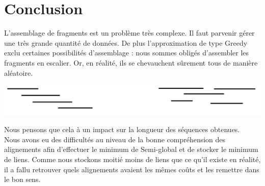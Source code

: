 \documentclass{article}
\begin{document}
\newpage
\section{Conclusion}
L'assemblage de fragments est un problème très complexe. Il faut parvenir gérer une très grande quantité de données. De plus l'approximation de type Greedy exclu certaines possibilités d'assemblage : nous sommes obligés d'assembler les fragments en escalier. Or, en réalité, ils se chevauchent sûrement tous de manière aléatoire.  \\
\begin{center}
\includegraphics[scale=0.5]{alignement1.png}
\end{center}

Nous pensons que cela à un impact sur la longueur des séquences obtenues. \\

Nous avons eu des difficultés au niveau de la bonne compréhension des alignements afin d'effectuer le minimum de Semi-global et de stocker le minimum de liens. Comme nous stockons moitié moins de liens que ce qu'il existe en réalité, il a fallu retrouver quels alignements avaient les mêmes coûts et les remettre dans le bon sens. 
\end{document}
